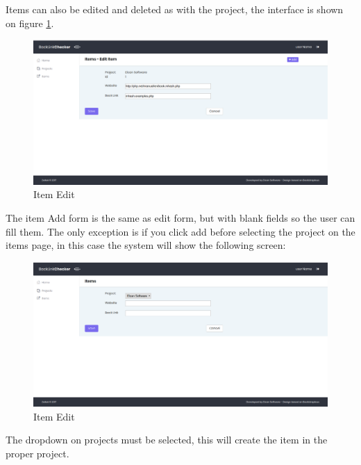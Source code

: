 Items can also be edited and deleted as with the project, the interface is shown on figure \ref{img:edititem}.
\begin{figure}[H]
	\caption{Item Edit}
	\label{img:edititem}
	\includegraphics[width=\textwidth]{images/items_edit}
\end{figure}

The item Add form is the same as edit form, but with blank fields so the user can fill them. The only exception is if you click add before selecting the project on the items page, in this case the system will show the following screen:
\begin{figure}[H]
	\caption{Item Edit}
	\label{img:itmadd}
	\includegraphics[width=\textwidth]{images/items_add}
\end{figure}
The dropdown on projects must be selected, this will create the item in the proper project.

